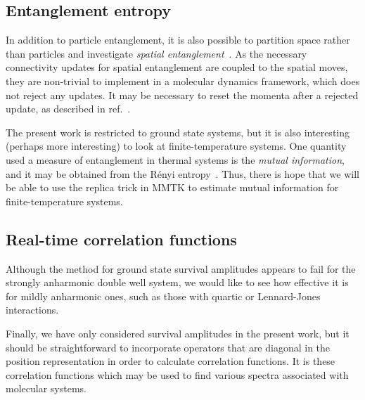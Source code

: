\subsection{Entanglement entropy}

In addition to particle entanglement, it is also possible to partition space rather than particles and investigate \emph{spatial entanglement}~\cite{herdman2014path}.
As the necessary connectivity updates for spatial entanglement are coupled to the spatial moves, they are non-trivial to implement in a molecular dynamics framework, which does not reject any updates.
It may be necessary to reset the momenta after a rejected update, as described in ref.~\cite[296]{tuckerman2010statistical}.

The present work is restricted to ground state systems, but it is also interesting (perhaps more interesting) to look at finite-temperature systems.
One quantity used a measure of entanglement in thermal systems is the \emph{mutual information}, and it may be obtained from the Rényi entropy~\cite{singh2011finite}.
Thus, there is hope that we will be able to use the replica trick in MMTK to estimate mutual information for finite-temperature systems.


\subsection{Real-time correlation functions}

Although the method for ground state survival amplitudes appears to fail for the strongly anharmonic double well system, we would like to see how effective it is for mildly anharmonic ones, such as those with quartic or Lennard-Jones interactions.

Finally, we have only considered survival amplitudes in the present work, but it should be straightforward to incorporate operators that are diagonal in the position representation in order to calculate correlation functions.
It is these correlation functions which may be used to find various spectra associated with molecular systems.
